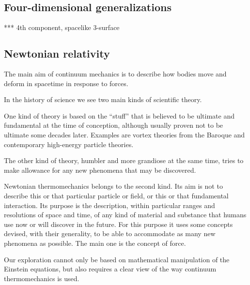 \documentclass[\ifafour a4paper,12pt,\else a5paper,10pt,\fi%
onecolumn,oneside,article,%
british%
]{memoir}
\theoremstyle{remark}
\theoremstyle{innote}
\renewcommand*{\|}{\nonscript\,\vert\nonscript\;\mathopen{}}
\begin{document}
\subsection{Four-dimensional generalizations}
\label{sec:4D_generalize}

*** 4th component, spacelike 3-surface


\subsection{Newtonian relativity}
\label{sec:newtonian_mechanics_aim}

The main aim of continuum mechanics is to describe how bodies move and
deform in spacetime in response to forces. 

In the history of science we see two main kinds of scientific theory.

One kind of theory is based on the \enquote{stuff} that is believed to be
ultimate and fundamental at the time of conception, although usually proven
not to be ultimate some decades later. Examples are vortex theories from
the Baroque and contemporary high-energy particle theories.

The other kind of theory, humbler and more grandiose at the same time,
tries to make allowance for any new phenomena that may be discovered.

Newtonian thermomechanics belongs to the second kind. Its aim is not to
describe this or that particular particle or field, or this or that
fundamental interaction. Its purpose is the description, within particular
ranges and resolutions of space and time, of any kind of material and
substance that humans use now or will discover in the future. For this
purpose it uses some concepts devised, with their generality, to be able to
accommodate as many new phenomena as possible. The main one is the concept
of force.

Our exploration cannot only be based on mathematical manipulation of the
Einstein equations, but also requires a clear view of the way continuum
thermomechanics is used. %
\end{document}
